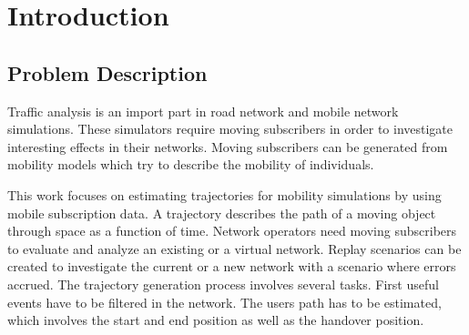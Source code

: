 \documentclass[master,english]{hgbthesis}
\begin{document}



\mainmatter         %



\chapter{Introduction}



\section{Problem Description}

Traffic analysis is an import part in road network and mobile network simulations. These simulators require moving subscribers in order to investigate interesting effects in their networks. Moving subscribers can be generated from mobility models which try to describe the mobility of individuals.

This work focuses on estimating trajectories for mobility simulations by using mobile subscription data. A trajectory describes the path of a moving object through space as a function of time. Network operators need moving subscribers to evaluate and analyze an existing or a virtual network. Replay scenarios can be created to investigate the current or a new network  with a scenario where errors accrued. The trajectory generation process involves several tasks. First useful events have to be filtered in the network. The users path has to be estimated, which involves the start and end position as well as the handover position. 
\end{document}
